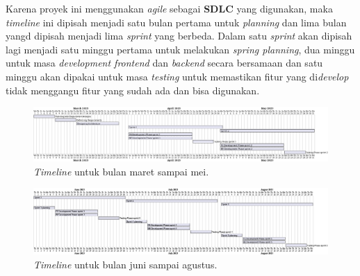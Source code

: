 \documentclass[a4paper]{article}
\begin{document}
Karena proyek ini menggunakan \textit{agile} sebagai \textbf{SDLC} yang digunakan, maka \textit{timeline} ini dipisah menjadi satu bulan pertama untuk \textit{planning} dan lima bulan yangd dipisah menjadi lima \textit{sprint} yang berbeda. Dalam satu \textit{sprint} akan dipisah lagi menjadi satu minggu pertama untuk melakukan \textit{spring planning}, dua minggu untuk masa \textit{development frontend} dan \textit{backend} secara bersamaan dan satu minggu akan dipakai untuk masa \textit{testing} untuk memastikan fitur yang di\textit{develop} tidak menggangu fitur yang sudah ada dan bisa digunakan.

\begin{figure}[h]
    \includegraphics[width=13cm]{sprint timeline.png}
    \centering
    \caption{\textit{Timeline} untuk bulan maret sampai mei.}
\end{figure}

\begin{figure}[h]
    \includegraphics[width=13cm]{sprint timeline 2.png}
    \centering
    \caption{\textit{Timeline} untuk bulan juni sampai agustus.}
\end{figure}

\newpage
\end{document}
